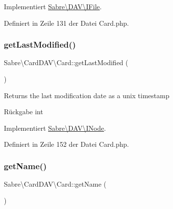 Implementiert \mbox{\hyperlink{interface_sabre_1_1_d_a_v_1_1_i_file_a2b207a6037dcbd4e7373b977dc60117f}{Sabre\textbackslash{}\+D\+A\+V\textbackslash{}\+I\+File}}.



Definiert in Zeile 131 der Datei Card.\+php.

\mbox{\label{class_sabre_1_1_card_d_a_v_1_1_card_ac23e42400b1adf96d325ddc5f25b1717}} 
\subsubsection{\texorpdfstring{get\+Last\+Modified()}{getLastModified()}}
{\footnotesize\ttfamily Sabre\textbackslash{}\+Card\+D\+A\+V\textbackslash{}\+Card\+::get\+Last\+Modified (\begin{DoxyParamCaption}{ }\end{DoxyParamCaption})}

Returns the last modification date as a unix timestamp

\begin{DoxyReturn}{Rückgabe}
int 
\end{DoxyReturn}


Implementiert \mbox{\hyperlink{interface_sabre_1_1_d_a_v_1_1_i_node_a06335f81c7d4ec2c6d9e327c8ce61014}{Sabre\textbackslash{}\+D\+A\+V\textbackslash{}\+I\+Node}}.



Definiert in Zeile 152 der Datei Card.\+php.

\mbox{\label{class_sabre_1_1_card_d_a_v_1_1_card_aa9304e2cfc2d3e362c781b87af8f7436}} 
\subsubsection{\texorpdfstring{get\+Name()}{getName()}}
{\footnotesize\ttfamily Sabre\textbackslash{}\+Card\+D\+A\+V\textbackslash{}\+Card\+::get\+Name (\begin{DoxyParamCaption}{ }\end{DoxyParamCaption})}

